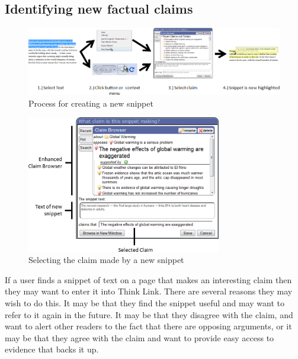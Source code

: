 \documentclass{chi2009}
\begin{document}
\subsection{Identifying new factual claims}
\label{newsnippet}

\begin{figure}[tb]
	\begin{center}
	\includegraphics[width=16cm]{../screenshots/newsnip_all.png}
	\caption{Process for creating a new snippet}
	\label{createprocess}
	\end{center}
\end{figure}


\begin{figure}[tb]
	\includegraphics[width=8.5cm]{../screenshots/snipsave_diagram.png}
	\caption{Selecting the claim made by a new snippet}
	\label{snipsavecrop}
\end{figure}


If a user finds a snippet of text on a page that makes an interesting claim then they may want to enter it into Think Link. There are several reasons they may wish to do this. It may be that they find the snippet useful and may want to refer to it again in the future. It may be that they disagree with the claim, and want to alert other readers to the fact that there are opposing arguments, or it may be that they agree with the claim and want to provide easy access to evidence that backs it up. 
\end{document}
